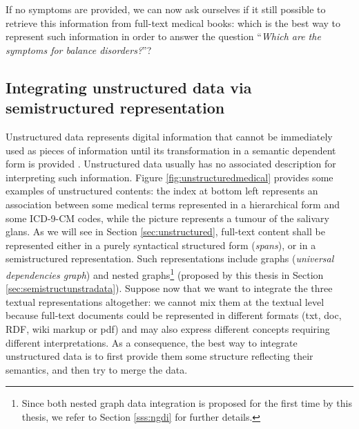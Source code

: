 If no symptoms are provided, we can now ask ourselves if it still possible to retrieve this information from full-text medical books: which is the best way to represent such information in order to answer the question ``\textit{Which are the symptoms for balance disorders?}''?



\subsection{Integrating unstructured data via semistructured representation}\label{sec:idifud}
Unstructured data represents digital information that cannot be immediately used as pieces of information until its transformation in a semantic dependent form is provided \cite{OrgKno}. Unstructured data usually has no associated description for interpreting such information. Figure \ref{fig:unstructuredmedical} provides some examples of unstructured contents: the index at bottom left represents an association between some medical terms represented in a hierarchical form and some ICD-9-CM codes, while the picture represents a tumour of the salivary glans. As we will see in Section \vref{sec:unstructured}, full-text content shall be represented either in a purely syntactical structured form (\textit{spans}), or in a semistructured representation. Such representations include graphs (\textit{universal dependencies graph}) and nested graphs\footnote{Since both nested graph data integration is proposed for the first time by this thesis, we refer to Section \vref{sss:ngdi} for further details.} (proposed by this thesis in Section \vref{sec:semistructunstradata}). Suppose now that we want to integrate the three textual representations altogether: we cannot mix them at the textual level because full-text documents could be represented in different formats (txt, doc, RDF, wiki markup or pdf) and may also express different concepts requiring different interpretations. As a consequence, the best way to integrate unstructured data is to first provide them  some structure reflecting their semantics, and  then try to merge the data.
